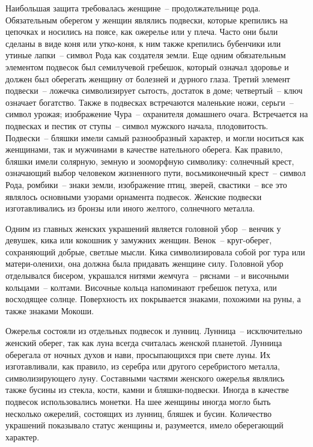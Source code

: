 \documentclass[pscyr,titlepage,chapters]{hedreport}
\begin{document}
  Наибольшая защита требовалась женщине~-- продолжательнице рода. Обязательным
  оберегом у женщин являлись подвески, которые крепились на цепочках и носились
  на поясе, как ожерелье или у плеча. Часто они были сделаны в виде коня или
  утко-коня, к ним также крепились бубенчики или утиные лапки~-- символ Рода как
  создателя земли. Еще одним обязательным элементом подвесок был семилучевой
  гребешок, который означал здоровье и должен был оберегать женщину от болезней
  и дурного глаза. Третий элемент подвески~-- ложечка символизирует сытость,
  достаток в доме; четвертый~-- ключ означает богатство. Также в подвесках
  встречаются маленькие ножи, серьги~-- символ урожая; изображение Чура~--
  охранителя домашнего очага. Встречается на подвесках и пестик от ступы~--
  символ мужского начала, плодовитость. Подвески~-- бляшки имели самый
  разнообразный характер, и могли носиться как женщинами, так и мужчинами в
  качестве нательного оберега. Как правило, бляшки имели солярную, земную и
  зооморфную символику: солнечный крест, означающий выбор человеком жизненного
  пути, восьмиконечный крест~-- символ Рода, ромбики~-- знаки земли, изображение
  птиц, зверей, свастики~-- все это являлось основными узорами орнамента
  подвесок. Женские подвески изготавливались из бронзы или иного желтого,
  солнечного металла.

  Одним из главных женских украшений является головной убор~-- венчик у девушек,
  кика или кокошник у замужних женщин. Венок~-- круг-оберег, сохраняющий добрые,
  светлые мысли. Кика символизировала собой рог тура или матери-оленихи, она
  должна была придавать женщине силу. Головной убор отделывался бисером,
  украшался нитями жемчуга~-- ряснами~-- и височными кольцами~-- колтами.
  Височные кольца напоминают гребешок петуха, или восходящее солнце. Поверхность
  их покрывается знаками, похожими на руны, а также знаками Мокоши.

  Ожерелья состояли из отдельных подвесок и лунниц. Лунница~-- исключительно
  женский оберег, так как луна всегда считалась женской планетой. Лунница
  оберегала от ночных духов и нави, просыпающихся при свете луны. Их
  изготавливали, как правило, из серебра или другого серебристого металла,
  символизирующего луну. Составными частями женского ожерелья являлись также
  бусины из стекла, кости, камни и бляшки-подвески. Иногда в качестве подвесок
  использовались монетки. На шее женщины иногда могло быть несколько ожерелий,
  состоящих из лунниц, бляшек и бусин. Количество украшений показывало статус
  женщины и, разумеется, имело оберегающий характер.
\end{document}
